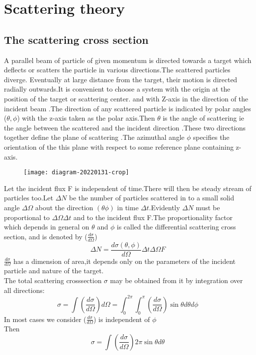 \chapter{Scattering theory}
\section{The scattering cross section}
A parallel beam of particle of given momentum is directed towards a target which deflects or scatters the particle in various directions.The scattered particles diverge. Eventually at large distance from the target, their motion is directed radially outwards.It is convenient to choose a system with the origin at the position of the target or scattering center. and with Z-axis in the direction of the incident beam .The direction of any scattered particle is indicated by polar angles ($\theta, \phi$) with the z-axis taken as the polar axis.Then $\theta$ is the angle of scattering ie the angle between the scattered and the incident direction .These two directions together define the plane of scattering .The azimuthal angle $\phi$ specifies the orientation of the this plane with respect to some reference plane containing z-axis.\\
\begin{figure}[H]
	\centering
	\texttt{[image: diagram-20220131-crop]}
	\caption{}
	\label{}
\end{figure}
\par Let the incident flux F is independent of time.There will then be steady stream of particles too.Let $\Delta N$ be the number of particles scattered in to a small solid angle $\Delta \Omega$ about the direction $(\theta \phi)$ in time $\Delta t$.Evidently 
$\Delta N$ must be proportional to $\Delta \Omega \Delta t$ and to the incident flux F.The proportionality factor which depends in general on $\theta$ and $\phi$ is called the differential scattering cross section, and is denoted by ($\frac{d\sigma}{d\Omega}$)\\
$$ \Delta N=\frac{d\sigma(\theta,\phi)}{d\Omega}\Delta t \Delta \Omega F$$
$\frac{d\sigma}{d\Omega}$ has a dimension of area,it depends only on the parameters of the incident particle and nature of the target.\\
The total scattering crosssection $\sigma$ may be obtained from it by integration over all directions:\\
$$\sigma=\int (\frac{d\sigma}{d\Omega})d\Omega=\int_{0}^{2\pi}\int_{0}^{\pi}(\frac{d\sigma}{d\Omega})\sin \theta d\theta d\phi$$
In most cases we consider ($\frac{d\sigma}{d\Omega}$) is independent of $\phi$\\
Then $$\sigma=\int (\frac{d\sigma}{d\Omega}) 2\pi \sin \theta d \theta$$
